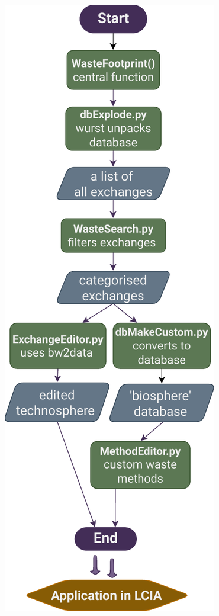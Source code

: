 \documentclass[a0paper,fleqn]{betterposter}
\begin{document}
{\includegraphics[width=\textwidth]{img/Flowchart_WasteFootprint}
}
\end{document}
